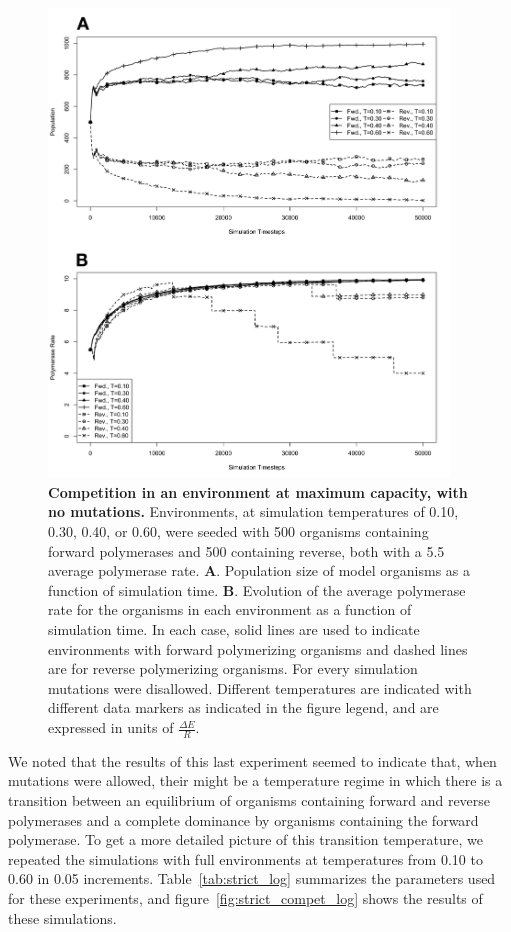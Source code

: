 \begin{figure}[!ht]
	\begin{center}
		\includegraphics[width=0.95\textwidth]{strict_compet_nomut}
	\end{center}
	\caption{
		{\bf Competition in an environment at maximum capacity, with no mutations.}  Environments, at simulation temperatures of 0.10, 0.30, 0.40, or 0.60, were seeded with 500 organisms containing forward polymerases and 500 containing reverse, both with a 5.5 average polymerase rate. \textbf{A}. Population size of model organisms as a function of simulation time. \textbf{B}. Evolution of the average polymerase rate for the organisms in each environment as a function of simulation time. In each case, solid lines are used to indicate environments with forward polymerizing organisms and dashed lines are for reverse polymerizing organisms. For every simulation mutations were disallowed. Different temperatures are indicated with different data markers as indicated in the figure legend, and are expressed in units of $\frac{\Delta E}{R}$.
		}
		\label{fig:strict_compet_nomut}
\end{figure}

We noted that the results of this last experiment seemed to indicate that, when mutations were allowed, their might be a temperature regime in which there is a transition between an equilibrium of organisms containing forward and reverse polymerases and a complete dominance by organisms containing the forward polymerase. To get a more detailed picture of this transition temperature, we repeated the simulations with full environments at temperatures from 0.10 to 0.60 in 0.05 increments. Table~\ref{tab:strict_log} summarizes the parameters used for these experiments, and figure~\ref{fig:strict_compet_log} shows the results of these simulations.

